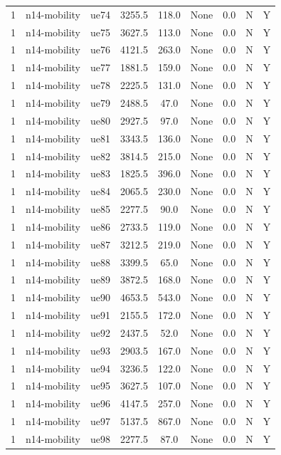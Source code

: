 \begin{table}[ht]
\begin{tabular}{|c|c|c|c|c|c|c|c|c|}
1 & n14-mobility & ue74 & 3255.5 & 118.0 & None & 0.0 & N & Y \\
1 & n14-mobility & ue75 & 3627.5 & 113.0 & None & 0.0 & N & Y \\
1 & n14-mobility & ue76 & 4121.5 & 263.0 & None & 0.0 & N & Y \\
1 & n14-mobility & ue77 & 1881.5 & 159.0 & None & 0.0 & N & Y \\
1 & n14-mobility & ue78 & 2225.5 & 131.0 & None & 0.0 & N & Y \\
1 & n14-mobility & ue79 & 2488.5 & 47.0 & None & 0.0 & N & Y \\
1 & n14-mobility & ue80 & 2927.5 & 97.0 & None & 0.0 & N & Y \\
1 & n14-mobility & ue81 & 3343.5 & 136.0 & None & 0.0 & N & Y \\
1 & n14-mobility & ue82 & 3814.5 & 215.0 & None & 0.0 & N & Y \\
1 & n14-mobility & ue83 & 1825.5 & 396.0 & None & 0.0 & N & Y \\
1 & n14-mobility & ue84 & 2065.5 & 230.0 & None & 0.0 & N & Y \\
1 & n14-mobility & ue85 & 2277.5 & 90.0 & None & 0.0 & N & Y \\
1 & n14-mobility & ue86 & 2733.5 & 119.0 & None & 0.0 & N & Y \\
1 & n14-mobility & ue87 & 3212.5 & 219.0 & None & 0.0 & N & Y \\
1 & n14-mobility & ue88 & 3399.5 & 65.0 & None & 0.0 & N & Y \\
1 & n14-mobility & ue89 & 3872.5 & 168.0 & None & 0.0 & N & Y \\
1 & n14-mobility & ue90 & 4653.5 & 543.0 & None & 0.0 & N & Y \\
1 & n14-mobility & ue91 & 2155.5 & 172.0 & None & 0.0 & N & Y \\
1 & n14-mobility & ue92 & 2437.5 & 52.0 & None & 0.0 & N & Y \\
1 & n14-mobility & ue93 & 2903.5 & 167.0 & None & 0.0 & N & Y \\
1 & n14-mobility & ue94 & 3236.5 & 122.0 & None & 0.0 & N & Y \\
1 & n14-mobility & ue95 & 3627.5 & 107.0 & None & 0.0 & N & Y \\
1 & n14-mobility & ue96 & 4147.5 & 257.0 & None & 0.0 & N & Y \\
1 & n14-mobility & ue97 & 5137.5 & 867.0 & None & 0.0 & N & Y \\
1 & n14-mobility & ue98 & 2277.5 & 87.0 & None & 0.0 & N & Y \\

\end{tabular}
\end{table}
